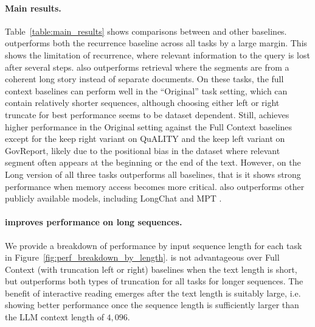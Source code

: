 \paragraph{Main results.}
Table~\ref{table:main_results} shows comparisons between \sysname{} and other baselines. \sysname{} outperforms both the recurrence  baseline across all tasks by a large margin. This shows the limitation of recurrence, where  relevant information to the query is lost after several steps. 
 \sysname{}  also outperforms retrieval where the segments are from a coherent long story instead of separate documents.
On these tasks, the full context baselines can perform well in the ``Original'' task setting, which can contain relatively shorter sequences, although choosing either left or right truncate for best performance seems to be dataset dependent.  Still, \sysname{} achieves higher performance in the Original setting against the Full Context baselines except for the keep right variant on QuALITY and the keep left variant on GovReport, likely due to the positional bias in the dataset where relevant segment often appears at the beginning or the end of the text. However, on the Long version of all three tasks \sysname{} outperforms all baselines, that is it shows strong performance when memory access becomes more critical.
\sysname{} also outperforms other publicly available models, including LongChat \citep{longchat2023} and MPT \citep{mosaic2023introducing}.

\paragraph{\sysname{} improves performance on long sequences.}
We provide a breakdown of performance by input sequence length for each task in Figure~\ref{fig:perf_breakdown_by_length}.
\sysname{} is not advantageous over Full Context (with truncation left or right) baselines when the text length is short, but outperforms both types of truncation for all tasks for longer sequences. The benefit of interactive reading emerges after the text length is suitably large, i.e. showing better performance once the sequence length is sufficiently larger than the LLM context length of $4,096$.

